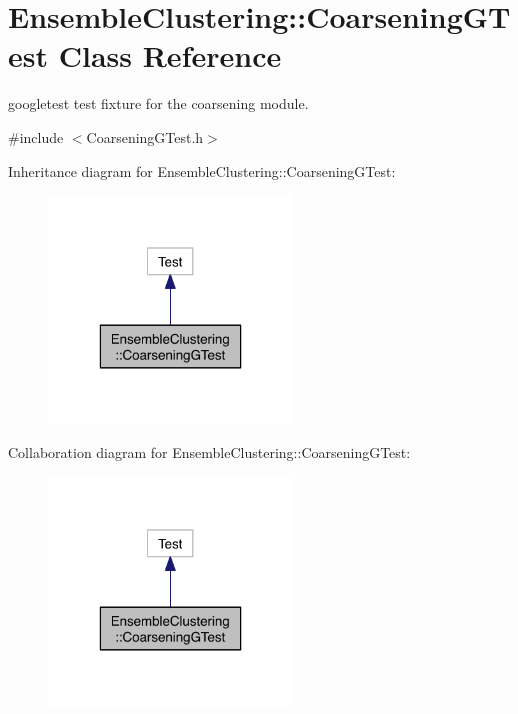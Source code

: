 \hypertarget{class_ensemble_clustering_1_1_coarsening_g_test}{\section{Ensemble\-Clustering\-:\-:Coarsening\-G\-Test Class Reference}
\label{class_ensemble_clustering_1_1_coarsening_g_test}
}


googletest test fixture for the coarsening module.  




{\ttfamily \#include $<$Coarsening\-G\-Test.\-h$>$}



Inheritance diagram for Ensemble\-Clustering\-:\-:Coarsening\-G\-Test\-:
\nopagebreak
\begin{figure}[H]
\begin{center}
\leavevmode
\includegraphics[width=184pt]{class_ensemble_clustering_1_1_coarsening_g_test__inherit__graph}
\end{center}
\end{figure}


Collaboration diagram for Ensemble\-Clustering\-:\-:Coarsening\-G\-Test\-:
\nopagebreak
\begin{figure}[H]
\begin{center}
\leavevmode
\includegraphics[width=184pt]{class_ensemble_clustering_1_1_coarsening_g_test__coll__graph}
\end{center}
\end{figure}


